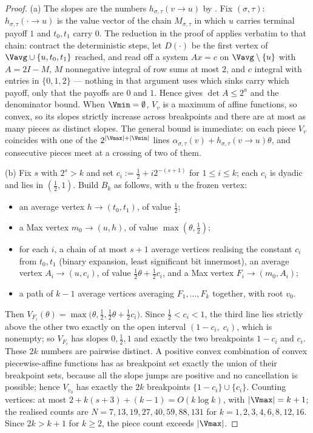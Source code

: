 \begin{proof}
(a) The slopes are the numbers $h_{\sigma,\tau}(v\to u)$ by
. Fix $(\sigma,\tau)$: $h_{\sigma,\tau}(\cdot\to u)$
is the value vector of the chain $M_{\sigma,\tau}$ in which $u$ carries
terminal payoff $1$ and $t_0,t_1$ carry $0$. The reduction in the proof of
 applies verbatim to that chain: contract the
deterministic steps, let $D(\cdot)$ be the first vertex of
$\Vavg\cup\{u,t_0,t_1\}$ reached, and read off a system $Ax=c$ on
$\Vavg\setminus\{u\}$ with $A=2I-M$, $M$ nonnegative integral of row sums
at most $2$, and $c$ integral with entries in $\{0,1,2\}$ --- nothing in
that argument uses which sinks carry which payoff, only that the payoffs
are $0$ and $1$. Hence  gives
$\det A\le2^{a}$ and the denominator bound. When
$\Vmin=\emptyset$, $V_v$ is a maximum of affine functions, so convex, so
its slopes strictly increase across breakpoints and there are at most as
many pieces as distinct slopes. The general bound is immediate: on each
piece $V_v$ coincides with one of the $2^{|\Vmax|+|\Vmin|}$ lines
$\alpha_{\sigma,\tau}(v)+h_{\sigma,\tau}(v\to u)\theta$, and consecutive
pieces meet at a crossing of two of them.

(b) Fix $s$ with $2^{s}>k$ and set $c_i:=\tfrac12+i2^{-(s+1)}$ for
$1\le i\le k$; each $c_i$ is dyadic and lies in $(\tfrac12,1)$. Build
$B_k$ as follows, with $u$ the frozen vertex:
\begin{itemize}[leftmargin=1.6em]
\item an average vertex $h\to(t_0,t_1)$, of value $\tfrac12$;
\item a Max vertex $m_0\to(u,h)$, of value $\max(\theta,\tfrac12)$;
\item for each $i$, a chain of at most $s+1$ average vertices realising the
  constant $c_i$ from $t_0,t_1$ (binary expansion, least significant bit
  innermost), an average vertex $A_i\to(u,c_i)$, of value
  $\tfrac12\theta+\tfrac12c_i$, and a Max vertex $F_i\to(m_0,A_i)$;
\item a path of $k-1$ average vertices averaging
  $F_1,\dots,F_k$ together, with root $v_0$.
\end{itemize}
Then $V_{F_i}(\theta)=\max\bigl(\theta,\tfrac12,\tfrac12\theta+\tfrac12c_i\bigr)$.
Since $\tfrac12<c_i<1$, the third line lies strictly above the other two
exactly on the open interval $(1-c_i,\;c_i)$, which is nonempty; so
$V_{F_i}$ has slopes $0,\tfrac12,1$ and exactly the two breakpoints
$1-c_i$ and $c_i$. These $2k$ numbers are pairwise distinct. A positive
convex combination of convex piecewise-affine functions has as breakpoint
set exactly the union of their breakpoint sets, because all the slope
jumps are positive and no cancellation is possible; hence $V_{v_0}$ has
exactly the $2k$ breakpoints $\{1-c_i\}\cup\{c_i\}$. Counting vertices:
at most $2+k(s+3)+(k-1)=O(k\log k)$, with $|\Vmax|=k+1$; the realised
counts are $N=7,13,19,27,40,59,88,131$ for $k=1,2,3,4,6,8,12,16$.
Since $2k>k+1$ for $k\ge2$, the piece count exceeds $|\Vmax|$.
\end{proof}

